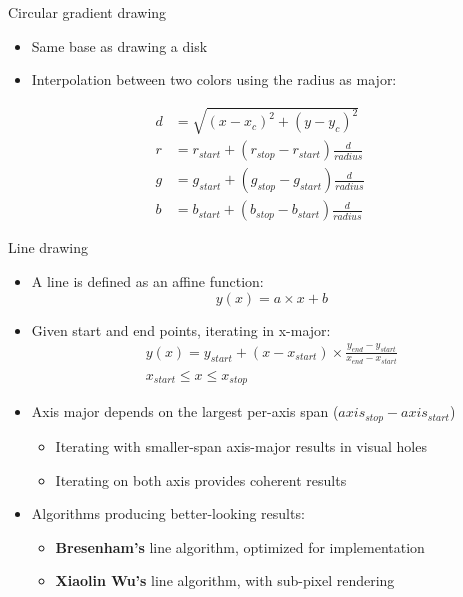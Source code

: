 \begin{frame}{Circular gradient drawing}
  \begin{itemize}
  \item Same base as drawing a disk
  \item Interpolation between two colors using the radius as major:
  \end{itemize}
\begin{align*}
d &= \sqrt{(x - x_c)^2 + (y - y_c)^2}\\
r &= r_{start} + (r_{stop} - r_{start}) \frac{d}{radius}\\
g &= g_{start} + (g_{stop} - g_{start}) \frac{d}{radius}\\
b &= b_{start} + (b_{stop} - b_{start}) \frac{d}{radius}
\end{align*}
\end{frame}

\begin{frame}{Line drawing}
  \begin{itemize}
  \item A line is defined as an affine function:
\[
y(x) = a \times x + b
\]
  \item Given start and end points, iterating in x-major:
\begin{gather*}
y(x) = y_{start} + (x - x_{start}) \times \frac{y_{end} - y_{start}}{x_{end} - x_{start}}\\
x_{start} \leq x \leq x_{stop}
\end{gather*}
  \item Axis major depends on the largest per-axis span (\(axis_{stop} - axis_{start}\))
    \begin{itemize}
    \item Iterating with smaller-span axis-major results in visual holes
    \item Iterating on both axis provides coherent results
    \end{itemize}
  \item Algorithms producing better-looking results:
    \begin{itemize}
    \item \textbf{Bresenham's} line algorithm, optimized for implementation
    \item \textbf{Xiaolin Wu's} line algorithm, with sub-pixel rendering
    \end{itemize}
  \end{itemize}
\end{frame}

